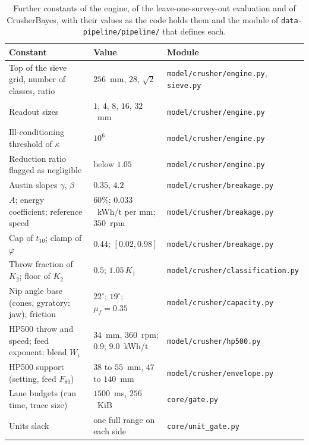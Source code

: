 \begin{table}[!t]
\centering
\caption{Further constants of the engine, of the leave-one-survey-out evaluation and of CrusherBayes, with their values as the code holds them and the
module of \texttt{data-pipeline/\allowbreak{}pipeline/\allowbreak{}} that defines each.}
\label{tab:constants}
\scriptsize
\begin{tabular}{@{}l l l@{}}
\toprule
Constant & Value & Module \\
\midrule
Top of the sieve grid, number of classes, ratio & $256$~mm, $28$, $\sqrt2$ & \texttt{model/\allowbreak{}crusher/\allowbreak{}engine.py}, \texttt{sieve.py} \\
Readout sizes & $1$, $4$, $8$, $16$, $32$~mm & \texttt{model/\allowbreak{}crusher/\allowbreak{}engine.py} \\
Ill-conditioning threshold of $\kappa$ & $10^{6}$ & \texttt{model/\allowbreak{}crusher/\allowbreak{}engine.py} \\
Reduction ratio flagged as negligible & below $1.05$ & \texttt{model/\allowbreak{}crusher/\allowbreak{}engine.py} \\
Austin slopes $\gamma$, $\beta$ & $0.35$, $4.2$ & \texttt{model/\allowbreak{}crusher/\allowbreak{}breakage.py} \\
$A$; energy coefficient; reference speed & $60\%$; $0.033$~kWh/t per mm; $350$~rpm & \texttt{model/\allowbreak{}crusher/\allowbreak{}breakage.py} \\
Cap of $t_{10}$; clamp of $\varphi$ & $0.44$; $[0.02, 0.98]$ & \texttt{model/\allowbreak{}crusher/\allowbreak{}breakage.py} \\
Throw fraction of $K_2$; floor of $K_2$ & $0.5$; $1.05\,K_1$ & \texttt{model/\allowbreak{}crusher/\allowbreak{}classification.py} \\
Nip angle base (cones, gyratory; jaw); friction & $22^\circ$; $19^\circ$; $\mu_f=0.35$ & \texttt{model/\allowbreak{}crusher/\allowbreak{}capacity.py} \\
HP500 throw and speed; feed exponent; blend $W_i$ & $34$~mm, $360$~rpm; $0.9$; $9.0$~kWh/t & \texttt{model/\allowbreak{}crusher/\allowbreak{}hp500.py} \\
HP500 support (setting, feed $F_{80}$) & $38$ to $55$~mm, $47$ to $140$~mm & \texttt{model/\allowbreak{}crusher/\allowbreak{}envelope.py} \\
Lane budgets (run time, trace size) & $1500$~ms, $256$~KiB & \texttt{core/\allowbreak{}gate.py} \\
Units slack & one full range on each side & \texttt{core/\allowbreak{}unit\_gate.py} \\

\end{tabular}
\end{table}
